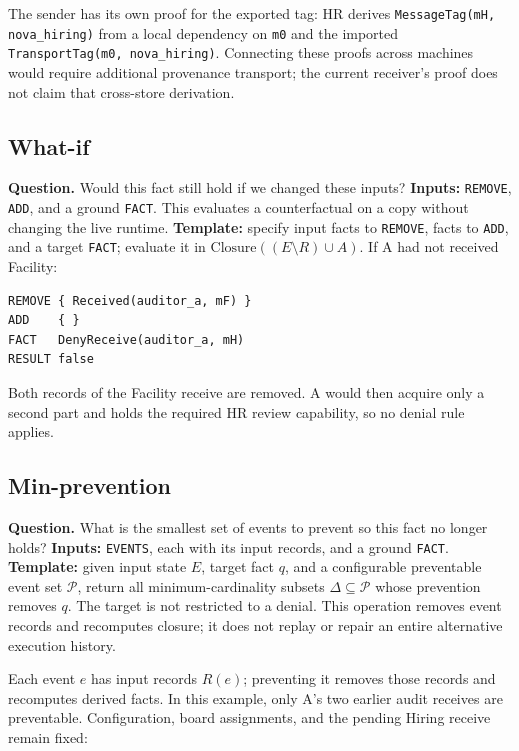 \documentclass[10pt]{article}
\begin{document}
The sender has its own proof for the exported tag: HR derives
\texttt{MessageTag(mH, nova\_hiring)} from a local dependency on \texttt{m0}
and the imported \texttt{TransportTag(m0, nova\_hiring)}. Connecting these proofs
across machines would require additional provenance transport; the current receiver's
proof does not claim that cross-store derivation.

\subsection{What-if}

\textbf{Question.} Would this fact still hold if we changed these inputs?
\textbf{Inputs:} \texttt{REMOVE}, \texttt{ADD}, and a ground \texttt{FACT}.
This evaluates a counterfactual on a copy without changing the live runtime.
\textbf{Template:} specify input facts to
\texttt{REMOVE}, facts to \texttt{ADD}, and a target \texttt{FACT}; evaluate it
in \(\mathrm{Closure}((E\setminus R)\cup A)\).
If A had not received Facility:

\begin{lstlisting}
REMOVE { Received(auditor_a, mF) }
ADD    { }
FACT   DenyReceive(auditor_a, mH)
RESULT false
\end{lstlisting}

Both records of the Facility receive are removed. A would then acquire only a second
part and holds the required HR review capability, so no denial rule applies.

\subsection{Min-prevention}

\textbf{Question.} What is the smallest set of events to prevent so this fact no longer holds?
\textbf{Inputs:} \texttt{EVENTS}, each with its input records, and a ground \texttt{FACT}.
\textbf{Template:} given input state \(E\), target fact \(q\), and a configurable
preventable event set \(\mathcal{P}\), return all minimum-cardinality subsets
\(\Delta\subseteq\mathcal{P}\) whose prevention removes \(q\). The target is not
restricted to a denial. This operation removes event records and recomputes closure;
it does not replay or repair an entire alternative execution history.

Each event \(e\) has input records \(R(e)\); preventing it removes those records and
recomputes derived facts. In this example, only A's two earlier audit receives are
preventable. Configuration, board assignments, and the pending Hiring receive remain
fixed:
\end{document}
